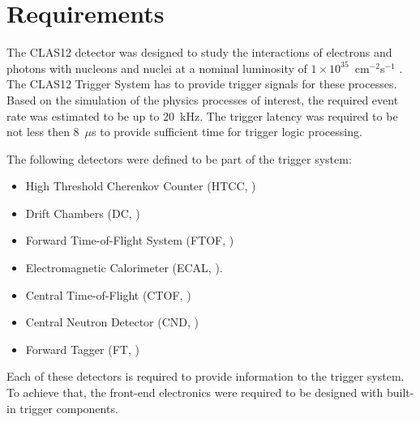 \section{Requirements}

The CLAS12 detector was designed to study the interactions of electrons and photons with nucleons and nuclei at a nominal luminosity of $1\times 10^{35}$~cm$^{-2}$s$^{-1}$ \cite{clas-nim}. The CLAS12 Trigger System has to provide trigger signals for these processes. Based on the simulation of the physics processes of interest, the required event rate was estimated to be up to 20~kHz. The trigger latency was required to be not less then 8~$\mu$s to provide sufficient time for trigger logic processing.


The following detectors were defined to be part of the trigger system:

\begin{itemize}
	\item High Threshold Cherenkov Counter (HTCC, \cite{htcc-ref})
	\item Drift Chambers (DC, \cite{dc-ref})
	\item Forward Time-of-Flight System (FTOF, \cite{ftof-ref})
	\item Electromagnetic Calorimeter (ECAL, \cite{ec-ref}).
	\item Central Time-of-Flight (CTOF, \cite{ctof-ref})
	\item Central Neutron Detector (CND, \cite{cnd-ref})
	\item Forward Tagger (FT, \cite{ft-ref})
\end{itemize}

Each of these detectors is required to provide information to the trigger system. To achieve that, the front-end electronics were required to be designed with built-in trigger components. 

 
